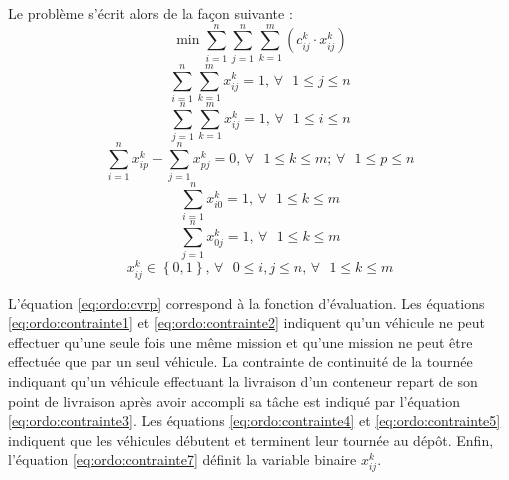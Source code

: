 Le problème s'écrit alors de la façon suivante : 
\begin{equation}
 \min \sum \limits^{n}_{i=1} \sum \limits^{n}_{j=1} \sum \limits^{m}_{k=1} \left( c^k_{ij} \cdot x^k_{ij} \right)
 \label{eq:ordo:cvrp}
\end{equation}
\begin{equation}
 \sum \limits_{i=1}^{n} \sum \limits_{k=1}^{m} x_{ij}^k = 1 \text{, }\forall \text{ } 1 \leq j \leq n
 \label{eq:ordo:contrainte1}
\end{equation}
\begin{equation}
 \sum \limits_{j=1}^{n} \sum \limits_{k=1}^{m} x_{ij}^k = 1 \text{, }\forall \text{ } 1 \leq i \leq n
 \label{eq:ordo:contrainte2}
\end{equation}
\begin{equation}
 \sum \limits_{i=1}^{n} x_{ip}^k - \sum \limits_{j=1}^{n} x_{pj}^k = 0 \text{, }\forall \text{ } 1 \leq k \leq m \text{; } \forall \text{ } 1 \leq p \leq n
 \label{eq:ordo:contrainte3}
\end{equation}
\begin{equation}
 \sum \limits_{i=1}^{n} x_{i0}^k = 1 \text{, }\forall \text{ } 1 \leq k \leq m
 \label{eq:ordo:contrainte4}
\end{equation}
\begin{equation}
 \sum \limits_{j=1}^{n} x_{0j}^k = 1 \text{, }\forall \text{ } 1 \leq k \leq m
 \label{eq:ordo:contrainte5}
\end{equation}
\begin{equation}
 x_{ij}^k \in \left\{0,1\right\} \text{, } \forall \text{ } 0 \leq i,j \leq n \text{, }\forall \text{ } 1 \leq k \leq m
 \label{eq:ordo:contrainte7}
\end{equation}

L'équation \ref{eq:ordo:cvrp} correspond à la fonction d'évaluation. Les équations \ref{eq:ordo:contrainte1} et \ref{eq:ordo:contrainte2} indiquent qu'un véhicule ne peut effectuer qu'une seule fois une même mission et qu'une mission ne peut être effectuée que par un seul véhicule. La contrainte de continuité de la tournée indiquant qu'un véhicule effectuant la livraison d'un conteneur repart de son point de livraison après avoir accompli sa tâche est indiqué par l'équation \ref{eq:ordo:contrainte3}. Les équations \ref{eq:ordo:contrainte4} et \ref{eq:ordo:contrainte5} indiquent que les véhicules débutent et terminent leur tournée au dépôt. Enfin, l'équation \ref{eq:ordo:contrainte7} définit la variable binaire $x_{ij}^k$.\\

